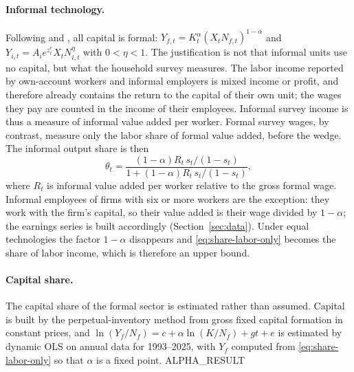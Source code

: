 \paragraph{Informal technology.} Following \citet{IhrigMoe2004} and \citet{ElginOztunali2012}, all capital is formal: $Y_{f,t}=K_t^{\alpha}(X_tN_{f,t})^{1-\alpha}$ and $Y_{i,t}=A_i e^{z^r_t}X_tN_{i,t}^{\eta}$ with $0<\eta<1$. The justification is not that informal units use no capital, but what the household survey measures. The labor income reported by own-account workers and informal employers is mixed income or profit, and therefore already contains the return to the capital of their own unit; the wages they pay are counted in the income of their employees. Informal survey income is thus a measure of informal value added per worker. Formal survey wages, by contrast, measure only the labor share of formal value added, before the wedge. The informal output share is then
\begin{equation}
\theta_t=\frac{(1-\alpha)R_t\,s_t/(1-s_t)}{1+(1-\alpha)R_t\,s_t/(1-s_t)},
\label{eq:share-labor-only}
\end{equation}
where $R_t$ is informal value added per worker relative to the gross formal wage. Informal employees of firms with six or more workers are the exception: they work with the firm's capital, so their value added is their wage divided by $1-\alpha$; the earnings series is built accordingly (Section~\ref{sec:data}). Under equal technologies the factor $1-\alpha$ disappears and \eqref{eq:share-labor-only} becomes the share of labor income, which is therefore an upper bound.

\paragraph{Capital share.} The capital share of the formal sector is estimated rather than assumed. Capital is built by the perpetual-inventory method from gross fixed capital formation in constant prices, and $\ln(Y_f/N_f)=c+\alpha\ln(K/N_f)+gt+e$ is estimated by dynamic OLS \citep{StockWatson1993} on annual data for 1993--2025, with $Y_f$ computed from \eqref{eq:share-labor-only} so that $\alpha$ is a fixed point. {{ALPHA_RESULT}}
